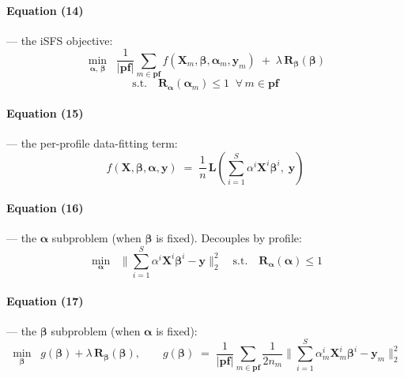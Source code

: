 \documentclass[11pt,a4paper]{article}
\begin{document}
\paragraph{Equation (14)} --- the iSFS objective:
\begin{equation}
\min_{\boldsymbol{\alpha},\,\boldsymbol{\beta}}\;\;\frac{1}{|\mathbf{pf}|}\sum_{m \in \mathbf{pf}} f(\mathbf{X}_m,\boldsymbol{\beta},\boldsymbol{\alpha}_m,\mathbf{y}_m) \;+\; \lambda\,\mathbf{R}_{\boldsymbol{\beta}}(\boldsymbol{\beta})
\end{equation}
\[
\text{s.t.}\quad \mathbf{R}_{\boldsymbol{\alpha}}(\boldsymbol{\alpha}_m) \leq 1\;\;\forall\,m \in \mathbf{pf}
\]

\paragraph{Equation (15)} --- the per-profile data-fitting term:
\begin{equation}
f(\mathbf{X},\boldsymbol{\beta},\boldsymbol{\alpha},\mathbf{y}) \;=\; \frac{1}{n}\,\mathbf{L}\!\left(\sum_{i=1}^{S}\alpha^{i}\mathbf{X}^{i}\boldsymbol{\beta}^{i},\;\mathbf{y}\right)
\end{equation}

\paragraph{Equation (16)} --- the $\boldsymbol{\alpha}$ subproblem (when $\boldsymbol{\beta}$ is fixed). Decouples by profile:
\begin{equation}
\min_{\boldsymbol{\alpha}}\;\;\Big\|\sum_{i=1}^{S}\alpha^{i}\mathbf{X}^{i}\boldsymbol{\beta}^{i} - \mathbf{y}\Big\|_{2}^{2}
\quad\text{s.t.}\quad \mathbf{R}_{\boldsymbol{\alpha}}(\boldsymbol{\alpha}) \leq 1
\end{equation}

\paragraph{Equation (17)} --- the $\boldsymbol{\beta}$ subproblem (when $\boldsymbol{\alpha}$ is fixed):
\begin{equation}
\min_{\boldsymbol{\beta}}\;\;g(\boldsymbol{\beta}) + \lambda\,\mathbf{R}_{\boldsymbol{\beta}}(\boldsymbol{\beta}),
\qquad
g(\boldsymbol{\beta}) \;=\; \frac{1}{|\mathbf{pf}|}\sum_{m \in \mathbf{pf}}\frac{1}{2 n_m}\Big\|\sum_{i=1}^{S}\alpha^{i}_{m}\mathbf{X}^{i}_{m}\boldsymbol{\beta}^{i} - \mathbf{y}_m\Big\|_{2}^{2}
\end{equation}
\end{document}
